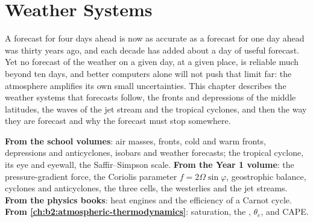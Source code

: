 \chapter{Weather Systems}\label{ch:b2:weather-systems}

A forecast for four days ahead is now as accurate as a forecast for one day ahead was thirty
years ago, and each decade has added about a day of useful forecast. Yet no forecast of the
weather on a given day, at a given place, is reliable much beyond ten days, and better computers
alone will not push that limit far: the atmosphere amplifies its own small uncertainties. This
chapter describes the weather systems that forecasts follow, the fronts and depressions of the
middle latitudes, the waves of the jet stream and the tropical cyclones, and then the way they
are forecast and why the forecast must stop somewhere.

\begin{recall}
\textbf{From the school volumes}: air masses, fronts, cold and warm fronts, depressions and
anticyclones, isobars and weather forecasts; the tropical cyclone, its eye and eyewall, the
Saffir--Simpson scale. \textbf{From the Year 1 volume}: the pressure-gradient force, the
Coriolis parameter $f = 2\Omega\sin\varphi$, geostrophic balance, cyclones and anticyclones, the
three cells, the westerlies and the jet streams. \textbf{From the physics books}: heat engines
and the efficiency of a Carnot cycle. \textbf{From \cref{ch:b2:atmospheric-thermodynamics}}:
saturation, the , $\theta_e$,  and CAPE.
\end{recall}

